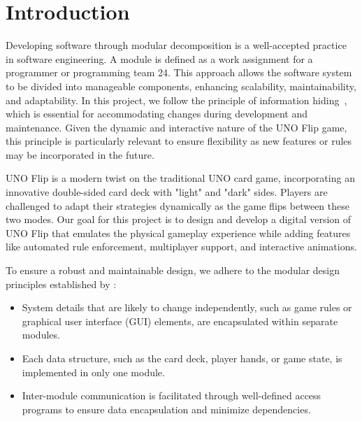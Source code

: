 \documentclass[12pt, titlepage]{article}
\begin{document}
\newpage

\tableofcontents

\listoftables

\listoffigures

\newpage


\section{Introduction}

Developing software through modular decomposition is a well-accepted practice in software engineering. A module is defined as a work assignment for a programmer or programming team 24. This approach allows the software system to be divided into manageable components, enhancing scalability, maintainability, and adaptability. In this project, we follow the principle of information hiding~\citep{Parnas1972a}, which is essential for accommodating changes during development and maintenance. Given the dynamic and interactive nature of the UNO Flip game, this principle is particularly relevant to ensure flexibility as new features or rules may be incorporated in the future.

UNO Flip is a modern twist on the traditional UNO card game, incorporating an innovative double-sided card deck with "light" and "dark" sides. Players are challenged to adapt their strategies dynamically as the game flips between these two modes. Our goal for this project is to design and develop a digital version of UNO Flip that emulates the physical gameplay experience while adding features like automated rule enforcement, multiplayer support, and interactive animations.

To ensure a robust and maintainable design, we adhere to the modular design principles established by \citet{ParnasEtAl1984}:

\begin{itemize}
\item System details that are likely to change independently, such as game rules or graphical user interface (GUI) elements, are encapsulated within separate modules.
\item Each data structure, such as the card deck, player hands, or game state, is implemented in only one module.
\item Inter-module communication is facilitated through well-defined access programs to ensure data encapsulation and minimize dependencies.
\end{itemize}
\end{document}

